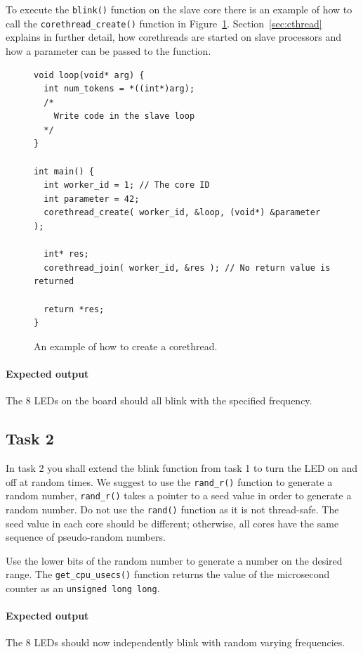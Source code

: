 \documentclass[a4paper,fontsize=10pt,twoside,DIV15,BCOR12mm,headinclude=true,footinclude=false,pagesize,bibtotoc]{scrbook}
\newcommand{\code}[1]{{\texttt{#1}}}
\begin{document}
To execute the \code{blink()} function on the slave core there is an example of
how to call the \code{corethread\_create()} function in Figure~\ref{fig:corethread}.
Section~\ref{sec:cthread} explains in further detail, how corethreads are started
on slave processors and how a parameter can be passed to the function.

\begin{figure}
\begin{Verbatim}[xleftmargin=1cm,xrightmargin=1cm,frame=single,framesep=3mm]
void loop(void* arg) {
  int num_tokens = *((int*)arg);
  /*
    Write code in the slave loop
  */
}

int main() {
  int worker_id = 1; // The core ID
  int parameter = 42;
  corethread_create( worker_id, &loop, (void*) &parameter );  

  int* res;
  corethread_join( worker_id, &res ); // No return value is returned

  return *res;  
}
\end{Verbatim}
\caption{\label{fig:corethread}An example of how to create a corethread.}
\end{figure}

\paragraph*{Expected output}
The 8 LEDs on the board should all blink with the specified frequency.

\subsection{Task 2}
In task 2 you shall extend the blink function from task 1 to turn the LED on and off at random times.
We suggest to use the \code{rand\_r()} function to generate a random number,
\code{rand\_r()} takes a pointer to a seed value in order to generate a random number.
Do not use the \code{rand()} function as it is not thread-safe.
The seed value in each core should be different; otherwise, all cores have the
same sequence of pseudo-random numbers.

Use the lower bits of the random number to generate a number on the desired range.
The \code{get\_cpu\_usecs()} function returns the value of the microsecond counter as an \code{unsigned long long}. 

\paragraph*{Expected output}
The 8 LEDs should now independently blink with random varying frequencies.
\end{document}
